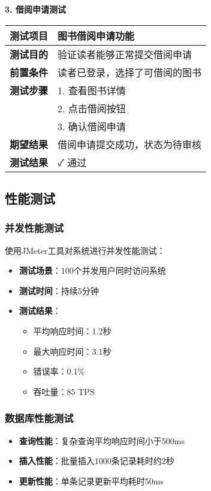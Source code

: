 \documentclass[12pt,a4paper]{article}
\begin{document}
\textbf{3. 借阅申请测试}
\begin{longtable}{|l|p{8cm}|}
\hline
\textbf{测试项目} & 图书借阅申请功能 \\
\hline
\textbf{测试目的} & 验证读者能够正常提交借阅申请 \\
\hline
\textbf{前置条件} & 读者已登录，选择了可借阅的图书 \\
\hline
\textbf{测试步骤} & 1. 查看图书详情\\
& 2. 点击借阅按钮\\
& 3. 确认借阅申请 \\
\hline
\textbf{期望结果} & 借阅申请提交成功，状态为待审核 \\
\hline
\textbf{测试结果} & ✓ 通过 \\
\hline
\end{longtable}

\subsection{性能测试}

\subsubsection{并发性能测试}
使用JMeter工具对系统进行并发性能测试：

\begin{itemize}
    \item \textbf{测试场景}：100个并发用户同时访问系统
    \item \textbf{测试时间}：持续5分钟
    \item \textbf{测试结果}：
    \begin{itemize}
        \item 平均响应时间：1.2秒
        \item 最大响应时间：3.1秒
        \item 错误率：0.1\%
        \item 吞吐量：85 TPS
    \end{itemize}
\end{itemize}

\subsubsection{数据库性能测试}
\begin{itemize}
    \item \textbf{查询性能}：复杂查询平均响应时间小于500ms
    \item \textbf{插入性能}：批量插入1000条记录耗时约2秒
    \item \textbf{更新性能}：单条记录更新平均耗时50ms
\end{itemize}
\end{document}
